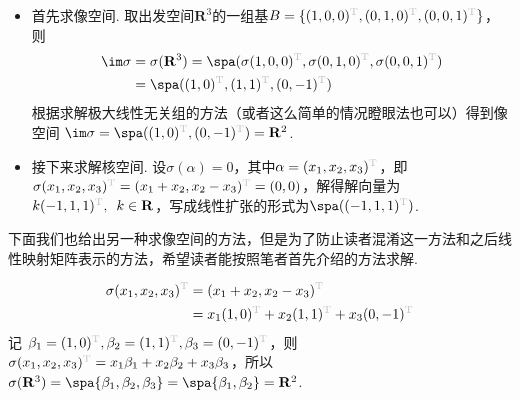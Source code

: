 \begin{solution}
    \begin{itemize}
        \item 首先求像空间. 取出发空间$\mathbf{R}^3$的一组基$B=\{(1,0,0)^{\color{lightgray}\mathrm{T}},(0,1,0)^{\color{lightgray}\mathrm{T}},(0,0,1)^{\color{lightgray}\mathrm{T}}\}$，则
        \begin{align*}
            \im \sigma &=\sigma(\mathbf{R}^3) = \spa(
                \sigma(1,0,0)^{\color{lightgray}\mathrm{T}},
                \sigma(0,1,0)^{\color{lightgray}\mathrm{T}},
                \sigma(0,0,1)^{\color{lightgray}\mathrm{T}}
                 ) \\
            &=\spa(
                (1,0)^{\color{lightgray}\mathrm{T}},
                (1,1)^{\color{lightgray}\mathrm{T}},
                (0,-1)^{\color{lightgray}\mathrm{T}}
                )
        \end{align*}
        根据求解极大线性无关组的方法（或者这么简单的情况瞪眼法也可以）得到像空间
        $\im \sigma=\spa((1,0)^{\color{lightgray}\mathrm{T}},(0,-1)^{\color{lightgray}\mathrm{T}})=\mathbf{R}^2$.

        \item 接下来求解核空间. 设$\sigma(\alpha)=0$，其中$\alpha=(x_1,x_2,x_3)^{\color{lightgray}\mathrm{T}}$，即$\sigma(x_1,x_2,x_3)^{\color{lightgray}\mathrm{T}}=(x_1+x_2,x_2-x_3)^{\color{lightgray}\mathrm{T}}=(0,0)$，解得解向量为$k(-1,1,1)^{\color{lightgray}\mathrm{T}},\enspace k\in\mathbf{R}$，写成线性扩张的形式为$\spa((-1,1,1)^{\color{lightgray}\mathrm{T}})$.
    \end{itemize}
\end{solution}

下面我们也给出另一种求像空间的方法，但是为了防止读者混淆这一方法和之后线性映射矩阵表示的方法，希望读者能按照笔者首先介绍的方法求解.
\begin{solution}
    \begin{align*}
        \sigma(x_1, x_2, x_3)^{\color{lightgray}\mathrm{T}} &= (x_1 + x_2, x_2 - x_3)^{\color{lightgray}\mathrm{T}}\\
        &= x_1(1, 0)^{\color{lightgray}\mathrm{T}} + x_2(1, 1)^{\color{lightgray}\mathrm{T}} + x_3(0, -1)^{\color{lightgray}\mathrm{T}}
    \end{align*}
    记 $\beta_1 = (1, 0)^{\color{lightgray}\mathrm{T}}, \beta_2 = (1, 1)^{\color{lightgray}\mathrm{T}}, \beta_3 = (0, -1)^{\color{lightgray}\mathrm{T}}$，则 $\sigma(x_1, x_2, x_3)^{\color{lightgray}\mathrm{T}} = x_1 \beta_1 + x_2 \beta_2 + x_3 \beta_3$，所以 $\sigma(\mathbf{R}^3) = \spa\{\beta_1, \beta_2, \beta_3\} = \spa \{\beta_1, \beta_2\}=\mathbf{R}^2$.
\end{solution}

